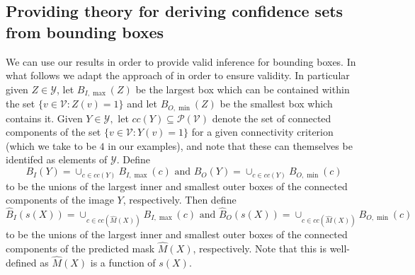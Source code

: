 \subsection{Providing theory for deriving confidence sets from bounding boxes}\label{AA:BBtheory}
We can use our results in order to provide valid inference for bounding boxes.  In what follows we adapt the approach of \cite{Andeol2023} in order to ensure validity. In particular given $Z \in \mathcal{Y}$, let $B_{I, \max}(Z)$ be the largest box which can be contained within the set $\lbrace v\in \mathcal{V}: Z(v) = 1 \rbrace$ and let $ B_{O, \min}(Z)$ be the smallest box which contains it. Given $Y \in \mathcal{Y}, $ let $cc(Y) \subseteq \mathcal{P}(\mathcal{V})$ denote the set of connected components of the set $\lbrace v\in \mathcal{V}: Y(v) = 1 \rbrace$ for a given connectivity criterion (which we take to be $4$ in our examples), and note that these can themselves be identifed as elements of $\mathcal{Y}$. Define 
$$B_I(Y) = \cup_{c \in cc(Y)} B_{I, \max}(c) \text{ and } B_O(Y) = \cup_{c \in cc(Y)} B_{O, \min}(c)$$
to be the unions of the largest inner and smallest outer boxes of the connected components of the image $Y$, respectively. Then define
$$\hat{B}_I(s(X)) = \cup_{c \in cc(\hat{M}(X)) } B_{I, \max}(c) \text{ and } \hat{B}_O(s(X)) = \cup_{c \in cc(\hat{M}(X))} B_{O, \min}(c)$$
to be the unions of the largest inner and smallest outer boxes of the connected components of the predicted mask $\hat{M}(X)$, respectively. Note that this is well-defined as $\hat{M}(X)$ is a function of $s(X)$.

